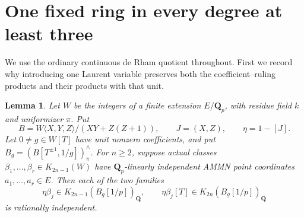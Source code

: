\documentclass[11pt,a4paper]{amsart}
\numberwithin{equation}{section}
\newtheorem{lemma}[theorem]{Lemma}
\theoremstyle{definition}
\theoremstyle{remark}
\newcommand{\Q}{\mathbf Q}
\begin{document}
\section{One fixed ring in every degree at least three}
\label{d3:sec:singlefixedalldegree}

We use the ordinary continuous de Rham quotient throughout.
First we record why introducing one Laurent variable preserves both
the coefficient--ruling products and their products with that unit.

\begin{lemma}\label{d3:lem:onelaurentcoefficientdetector}
Let $W$ be the integers of a finite extension $E/\Q_p$, with
residue field $k$ and uniformizer $\pi$. Put
\[
 B=W\langle X,Y,Z\rangle/(XY+Z(Z+1)),\qquad
 J=(X,Z),\qquad \eta=1-[J].
\]
Let $0\ne g\in W[T]$ have unit nonzero coefficients, and put
$B_g=(B[T^{\pm1},1/g])^\wedge_\pi$.
For $n\geq2$, suppose actual classes
$\beta_1,\ldots,\beta_r\in K_{2n-1}(W)$ have
$\Q_p$-linearly independent AMMN point coordinates
$a_1,\ldots,a_r\in E$.
Then each of the two families
\[
 \eta\beta_j\in K_{2n-1}(B_g[1/p])_{\Q},\qquad
 \eta\beta_j[T]\in K_{2n}(B_g[1/p])_{\Q}
\]
is rationally independent.
\end{lemma}
\end{document}
